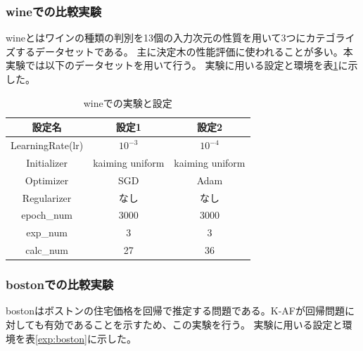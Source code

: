 \subsubsection{wineでの比較実験}
\label{impl:wine}

wineとはワインの種類の判別を13個の入力次元の性質を用いて3つにカテゴライズするデータセットである。
主に決定木の性能評価に使われることが多い。本実験では以下のデータセットを用いて行う。
実験に用いる設定と環境を表\ref{exp:wine}に示した。


\begin{table}[htbp]
    \begin{center}
        \caption{wineでの実験と設定}
        \label{exp:wine}
        \vspace{2mm} 
        \begin{tabular}{ |c|c|c| }
        設定名 & 設定1 & 設定2 \\
        \hline
        LearningRate(lr)         & $ 10^{-3} $ & $ 10^{-4} $ \\
        Initializer       & kaiming uniform & kaiming uniform \\
        Optimizer           & SGD & Adam \\
        Regularizer     & なし & なし \\
        epoch\_num       & 3000 &  3000 \\
        exp\_num         & 3 & 3 \\
        calc\_num        & 27 & 36 \\
        \end{tabular}
    \end{center}
\end{table}


\subsubsection{bostonでの比較実験}
\label{impl:boston}

bostonはボストンの住宅価格を回帰で推定する問題である。K-AFが回帰問題に対しても有効であることを示すため、この実験を行う。
実験に用いる設定と環境を表\ref{exp:boston}に示した。

